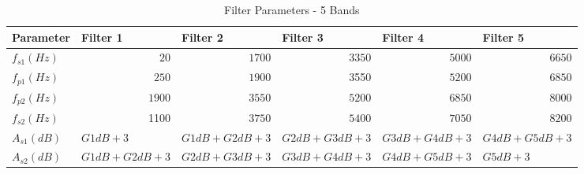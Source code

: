 \documentclass[12pt, onecolumn]{article}
\begin{document}
\begin{appendices}
\begin{table}[htbp]
  \centering
  \caption{Filter Parameters - 5 Bands}
  \begin{adjustbox}{width=0.9\linewidth}
    \begin{tabular}{|l|l|l|l|l|l|}
    \hline
    \textbf{Parameter} & \textbf{Filter 1} & \textbf{Filter 2} & \textbf{Filter 3} & \textbf{Filter 4} & \textbf{Filter 5} \\
    \hline
    $f_{s1} (Hz)$   & \multicolumn{1}{r|}{$20$} & \multicolumn{1}{r|}{$1700$} & \multicolumn{1}{r|}{$3350$} & \multicolumn{1}{r|}{$5000$} & \multicolumn{1}{r|}{$6650$} \\
    \hline
    $f_{p1} (Hz)$   & \multicolumn{1}{r|}{$250$} & \multicolumn{1}{r|}{$1900$} & \multicolumn{1}{r|}{3550} & \multicolumn{1}{r|}{$5200$} & \multicolumn{1}{r|}{$6850$} \\
    \hline
    $f_{p2} (Hz)$   & \multicolumn{1}{r|}{$1900$} & \multicolumn{1}{r|}{$3550$} & \multicolumn{1}{r|}{$5200$} & \multicolumn{1}{r|}{$6850$} & \multicolumn{1}{r|}{$8000$} \\
    \hline
    $f_{s2} (Hz)$   & \multicolumn{1}{r|}{1100} & \multicolumn{1}{r|}{$3750$} & \multicolumn{1}{r|}{$5400$} & \multicolumn{1}{r|}{$7050$} & \multicolumn{1}{r|}{$8200$} \\
    \hline
    $A_{s1} (dB)$   &$ G1dB + 3 $& $G1dB + G2dB + 3 $& $G2dB + G3dB + 3$ &$ G3dB + G4dB + 3 $& $G4dB + G5dB + 3$ \\
    \hline
    $A_{s2} (dB)$   & $G1dB + G2dB + 3 $&$ G2dB + G3dB + 3 $&$ G3dB + G4dB + 3$ &$ G4dB + G5dB + 3$ &$ G5dB + 3$ \\
    \hline
    \end{tabular}%
    \end{adjustbox}
  \label{tab:filtPara5Band}%
\end{table}%


\end{appendices}
\end{document}
